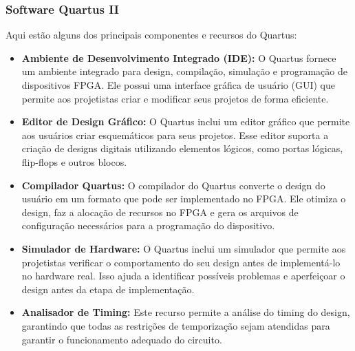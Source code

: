 \documentclass{CPSPresentation}
\begin{document}
\begin{frame}
	\frametitle{Software Quartus II}

	
	Aqui estão alguns dos principais componentes e recursos do Quartus:
	
	\begin{itemize}
		\justifying
		[triangle]
		\item \textbf{Ambiente de Desenvolvimento Integrado (IDE):} O Quartus fornece um ambiente integrado para design, compilação, simulação e programação de dispositivos FPGA. Ele possui uma interface gráfica de usuário (GUI) que permite aos projetistas criar e modificar seus projetos de forma eficiente.
		
		\item \textbf{Editor de Design Gráfico:} O Quartus inclui um editor gráfico que permite aos usuários criar esquemáticos para seus projetos. Esse editor suporta a criação de designs digitais utilizando elementos lógicos, como portas lógicas, flip-flops e outros blocos.
		
		\item \textbf{Compilador Quartus:} O compilador do Quartus converte o design do usuário em um formato que pode ser implementado no FPGA. Ele otimiza o design, faz a alocação de recursos no FPGA e gera os arquivos de configuração necessários para a programação do dispositivo.
		
		\item \textbf{Simulador de Hardware:} O Quartus inclui um simulador que permite aos projetistas verificar o comportamento do seu design antes de implementá-lo no hardware real. Isso ajuda a identificar possíveis problemas e aperfeiçoar o design antes da etapa de implementação.
		
		\item \textbf{Analisador de Timing:} Este recurso permite a análise do timing do design, garantindo que todas as restrições de temporização sejam atendidas para garantir o funcionamento adequado do circuito.
	\end{itemize}
	
	
\end{frame}
\end{document}
